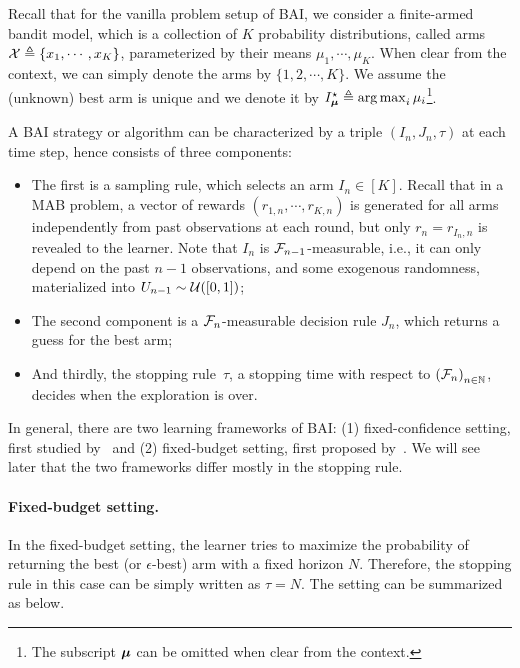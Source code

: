 Recall that for the vanilla problem setup of BAI, we consider a finite-armed bandit model, which is a collection of $K$ probability distributions, called arms $\mathcal{X}\triangleq\{x_1,\cdots,x_K\}$, parameterized by their means $\mu_1, \cdots, \mu_K$. When clear from the context, we can simply denote the arms by $\{1,2,\cdots,K\}$. We assume the (unknown) best arm is unique and we denote it by $I_{{\boldsymbol \mu}}^\star \triangleq \operatorname*{arg\,max}_i \mu_i$\footnote{The subscript ${\boldsymbol \mu}$ can be omitted when clear from the context.}. 

A BAI strategy or algorithm can be characterized by a triple $(I_n, J_n, \tau)$ at each time step, hence consists of three components: 
\begin{itemize}
    \item The first is a \gls{sampling rule}, which selects an arm $I_n\in[K]$. Recall that in a MAB problem, a vector of rewards $(r_{1,n},\cdots,r_{K,n})$ is generated for all arms independently from past observations at each round, but only $r_n = r_{I_n,n}$ is revealed to the learner. Note that $I_n$ is $\mathcal{F}_{n-1}$-measurable, i.e., it can only depend on the past $n-1$ observations, and some exogenous randomness, materialized into $U_{n-1} \sim \mathcal{U}([0,1])$;
    \item The second component is a $\mathcal{F}_{n}$-measurable \gls{decision rule} $J_n$, which returns a guess for the best arm;
    \item And thirdly, the \gls{stopping rule}~$\tau$, a stopping time with respect to $\left(\mathcal{F}_{n}\right)_{n \in \mathbb{N}}$, decides when the exploration is over.
\end{itemize}

In general, there are two learning frameworks of BAI: (1) \gls{fixed-confidence setting}, first studied by~\citep{even-dar2003confidence} and (2) \gls{fixed-budget setting}, first proposed by~\citep{audibert2010budget}. We will see later that the two frameworks differ mostly in the stopping rule.

\paragraph{Fixed-budget setting.}

In the fixed-budget setting, the learner tries to maximize the probability of returning the best (or $\epsilon$-best) arm with a fixed horizon $N$. Therefore, the stopping rule in this case can be simply written as $\tau=N$. The setting can be summarized as below.

